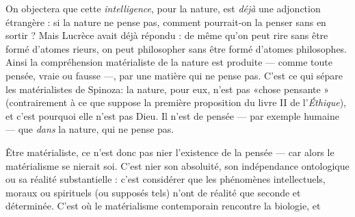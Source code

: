 On objectera que cette {\it intelligence}, pour la nature, est {\it déjà} une adjonction
étrangère : si la nature ne pense pas, comment pourrait-on la penser sans en
sortir ? Mais Lucrèce avait déjà répondu : de même qu’on peut rire sans être
formé d’atomes rieurs, on peut philosopher sans être formé d’atomes philosophes.
Ainsi la compréhension matérialiste de la nature est produite — comme
toute pensée, vraie ou fausse —, par une matière qui ne pense pas. C’est ce qui
sépare les matérialistes de Spinoza: la nature, pour eux, n’est pas «chose
pensante » (contrairement à ce que suppose la première proposition du livre II
de l'{\it Éthique}), et c’est pourquoi elle n’est pas Dieu. Il n’est de pensée — par
exemple humaine — que {\it dans} la nature, qui ne pense pas.

Être matérialiste, ce n’est donc pas nier l’existence de la pensée — car alors
le matérialisme se nierait soi. C’est nier son absoluité, son indépendance ontologique
ou sa réalité substantielle : c’est considérer que les phénomènes intellectuels,
moraux ou spirituels (ou supposés tels) n’ont de réalité que seconde et
déterminée. C’est où le matérialisme contemporain rencontre la biologie, et

